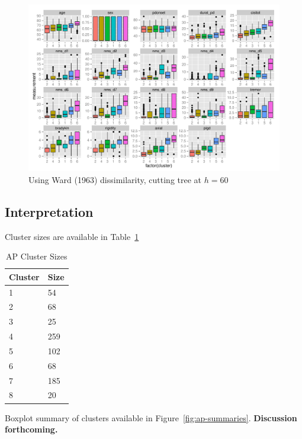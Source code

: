 \documentclass[letterpaper,12pt]{article}
\begin{document}
\begin{figure}[h]
  \centering
  \includegraphics[width=\linewidth]{hc-summaries-ward-D-h60.pdf}
  \caption{Using Ward (1963) dissimilarity, cutting tree at $h = 60$}
  \label{fig:hc-summaries-ward-D-h60}
\end{figure}


\subsection{Interpretation}

Cluster sizes are available in Table~\ref{tab:ap-cluster-sizes}

\begin{table}[h]
  \centering
  \begin{tabular}{l|l}
  Cluster & Size \\
  \hline
  1 & 54 \\
  2 & 68 \\
  3 & 25 \\
  4 & 259 \\
  5 & 102 \\
  6 & 68 \\
  7 & 185 \\
  8 & 20 \\
  \end{tabular}
  \caption{AP Cluster Sizes}
  \label{tab:ap-cluster-sizes}
\end{table}

Boxplot summary of clusters available in Figure~\ref{fig:ap-summaries}.
\textbf{Discussion forthcoming.}
\end{document}
